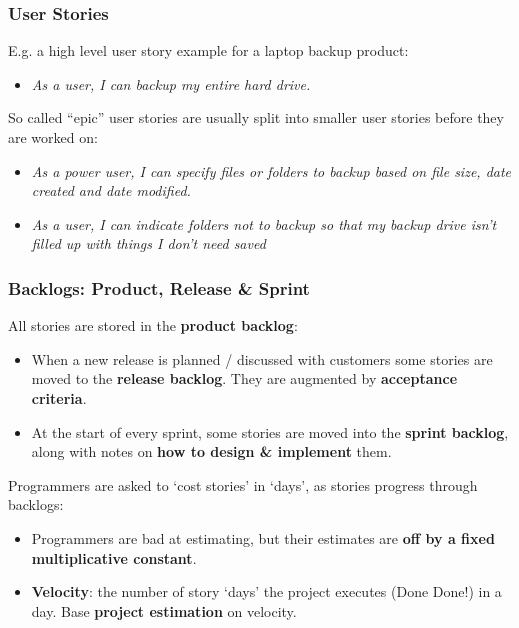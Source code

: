 \documentclass{beamer} %
\newcommand\emc[1]{\textcolor{midred}{\textbf{#1}}}
\begin{document}
\begin{frame}
  \frametitle{User Stories}
  E.g. a high level user story example for a laptop backup product:

  \begin{itemize}
  \item {\em As a user, I can backup my entire hard drive.}
    \end{itemize}

  So called ``epic'' user stories are usually split into smaller user stories before they are worked on:
  \begin{itemize}
   \item {\em As a power user, I can specify files or folders to backup based on file size, date created and date modified.}
   \item {\em As a user, I can indicate folders not to backup so that my backup drive isn't filled up with things I don't need saved}
  \end{itemize}
\end{frame}


\begin{frame}

\frametitle{Backlogs: Product, Release \& Sprint}

All stories are stored in the \emc{product backlog}:
\begin{itemize}
  \item When a new release is planned / discussed with customers some stories are moved to the \emc{release backlog}. They are augmented by \emc{acceptance criteria}.
  \item At the start of every sprint, some stories are moved into the \emc{sprint backlog}, along with notes on \emc{how to design \& implement} them.
  \end{itemize}

Programmers are asked to `cost stories' in `days', as stories progress through backlogs:
\begin{itemize}
  \item Programmers are bad at estimating, but their estimates are \emc{off by a fixed multiplicative constant}.
  \item \emc{Velocity}: the number of story `days' the project executes (Done Done!) in a day. Base \emc{project estimation} on velocity.
\end{itemize} 

\end{frame}
\end{document}
